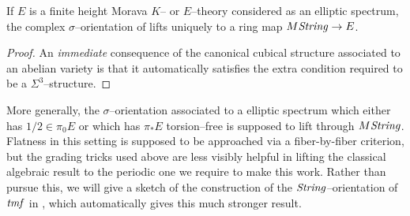 \begin{corollary}\label{EllipticSpectraAreOrientedByString}
If \(E\) is a finite height Morava \(K\)-- or \(E\)--theory considered as an elliptic spectrum, the complex \(\sigma\)--orientation of  lifts uniquely to a ring map \(M\mathit{String} \to E\).
\end{corollary}
\begin{proof}
An \emph{immediate} consequence of the canonical cubical structure associated to an abelian variety is that it automatically satisfies the extra condition required to be a \(\Sigma^3\)--structure.
\end{proof}

\begin{remark}
More generally, the \(\sigma\)--orientation associated to a elliptic spectrum which either has \(1/2 \in \pi_0 E\) or which has \(\pi_* E\) torsion--free is supposed to lift through \(M\mathit{String}\).  Flatness in this setting is supposed to be approached via a fiber-by-fiber criterion, but the grading tricks used above are less visibly helpful in lifting the classical algebraic result to the periodic one we require to make this work.  Rather than pursue this, we will give a sketch of the construction of the \(\mathit{String}\)--orientation of \(\mathit{tmf}\) in , which automatically gives this much stronger result.
\end{remark}

